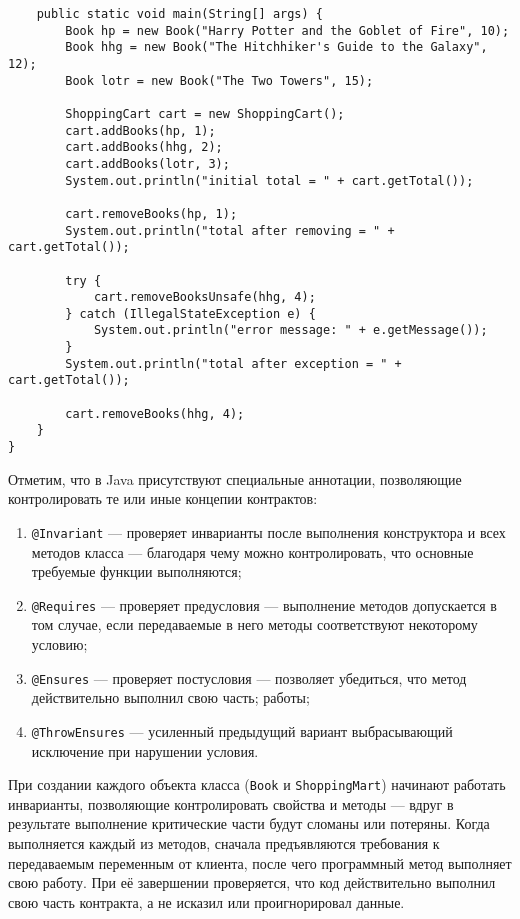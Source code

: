 \begin{lstlisting}
    public static void main(String[] args) {
        Book hp = new Book("Harry Potter and the Goblet of Fire", 10);
        Book hhg = new Book("The Hitchhiker's Guide to the Galaxy", 12);
        Book lotr = new Book("The Two Towers", 15);
 
        ShoppingCart cart = new ShoppingCart();
        cart.addBooks(hp, 1);
        cart.addBooks(hhg, 2);
        cart.addBooks(lotr, 3);
        System.out.println("initial total = " + cart.getTotal());
 
        cart.removeBooks(hp, 1);
        System.out.println("total after removing = " + cart.getTotal());
 
        try {
            cart.removeBooksUnsafe(hhg, 4);
        } catch (IllegalStateException e) {
            System.out.println("error message: " + e.getMessage());
        }
        System.out.println("total after exception = " + cart.getTotal());
 
        cart.removeBooks(hhg, 4);
    }
}
\end{lstlisting}

Отметим, что в Java присутствуют специальные аннотации, позволяющие контролировать те или иные концепии контрактов:

\begin{enumerate}
    \item \verb|@Invariant| — проверяет инварианты после выполнения конструктора и всех методов класса — благодаря чему можно контролировать, что основные требуемые функции выполняются;
    \item \verb|@Requires| — проверяет предусловия — выполнение методов допускается в том случае, если передаваемые в него методы соответствуют некоторому условию;
    \item \verb|@Ensures| — проверяет постусловия — позволяет убедиться, что метод действительно выполнил свою часть; работы;
    \item \verb|@ThrowEnsures| — усиленный предыдущий вариант выбрасывающий исключение при нарушении условия.
\end{enumerate}

При создании каждого объекта класса (\verb|Book| и \verb|ShoppingMart|) начинают работать инварианты, позволяющие контролировать свойства и методы — вдруг в результате выполнение критические части будут сломаны или потеряны. Когда выполняется каждый из методов, сначала предъявляются требования к передаваемым переменным от клиента, после чего программный метод выполняет свою работу. При её завершении проверяется, что код действительно выполнил свою часть контракта, а не исказил или проигнорировал данные.

